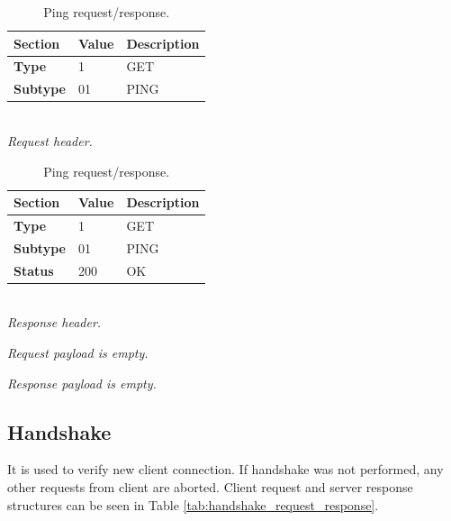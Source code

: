 \documentclass[english, sem, kiv, he, iso690alph, pdf, viewonly]{fasthesis}
\begin{document}
\begin{table}[h]
	\centering
	\begin{minipage}[b]{0.45\textwidth}
		\centering
		\begin{tabular}{|l|l|l|}
			\hline
			\textbf{Section} & \textbf{Value} & \textbf{Description} \\ \hline
			\textbf{Type} & 1 & GET \\ \hline
			\textbf{Subtype} & 01 & PING \\ \hline
		\end{tabular} \\
		\textit{Request header.}
	\end{minipage} 
	\hfill
	\begin{minipage}[b]{0.45\textwidth}
		\centering
		\begin{tabular}{|l|l|l|}
			\hline
			\textbf{Section} & \textbf{Value} & \textbf{Description} \\ \hline
			\textbf{Type} & 1 & GET \\ \hline
			\textbf{Subtype} & 01 & PING \\ \hline
			\textbf{Status} & 200 & OK \\ \hline
		\end{tabular} \\
		\textit{Response header.}
	\end{minipage} \newline

	\begin{minipage}[b]{0.45\textwidth}
		\centering
		\textit{Request payload is empty.}
	\end{minipage}	
	\hfill
	\begin{minipage}[b]{0.45\textwidth}
		\centering
		\textit{Response payload is empty.}
	\end{minipage}	
	\caption{Ping request/response.}
	\label{tab:ping_request_response}
\end{table}

\subsection{Handshake}
It is used to verify new client connection. If handshake was not performed, any other requests from client are aborted. Client request and server response structures can be seen in Table \ref{tab:handshake_request_response}.
\end{document}
